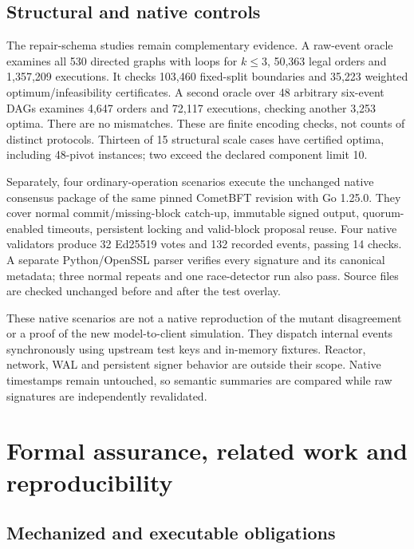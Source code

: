\subsection{Structural and native
controls}\label{structural-and-native-controls}

The repair-schema studies remain complementary evidence. A raw-event
oracle examines all 530 directed graphs with loops for \(k\le3\), 50,363
legal orders and 1,357,209 executions. It checks 103,460 fixed-split
boundaries and 35,223 weighted optimum/infeasibility certificates. A
second oracle over 48 arbitrary six-event DAGs examines 4,647 orders and
72,117 executions, checking another 3,253 optima. There are no
mismatches. These are finite encoding checks, not counts of distinct
protocols. Thirteen of 15 structural scale cases have certified optima,
including 48-pivot instances; two exceed the declared component limit
10.

Separately, four ordinary-operation scenarios execute the unchanged
native consensus package of the same pinned CometBFT revision with Go
1.25.0. They cover normal commit/missing-block catch-up, immutable
signed output, quorum-enabled timeouts, persistent locking and
valid-block proposal reuse. Four native validators produce 32 Ed25519
votes and 132 recorded events, passing 14 checks. A separate
Python/OpenSSL parser verifies every signature and its canonical
metadata; three normal repeats and one race-detector run also pass.
Source files are checked unchanged before and after the test overlay.

These native scenarios are not a native reproduction of the mutant
disagreement or a proof of the new model-to-client simulation. They
dispatch internal events synchronously using upstream test keys and
in-memory fixtures. Reactor, network, WAL and persistent signer behavior
are outside their scope. Native timestamps remain untouched, so semantic
summaries are compared while raw signatures are independently
revalidated.

\section{Formal assurance, related work and
reproducibility}\label{formal-assurance-related-work-and-reproducibility}

\subsection{Mechanized and executable
obligations}\label{mechanized-and-executable-obligations}

